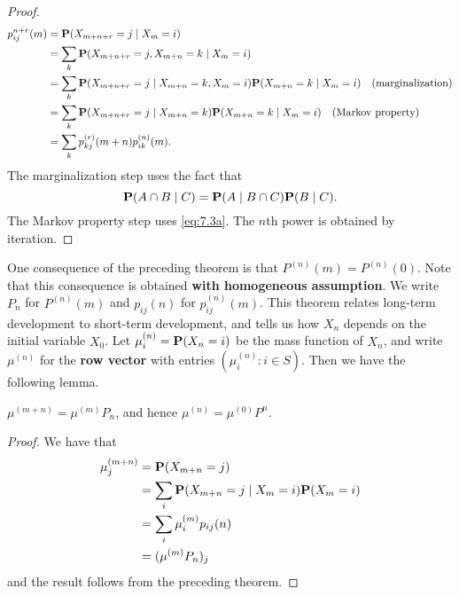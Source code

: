 \begin{proof}
    \begin{equation*}
        \begin{split}
            p_{ij}^{n+r}(m) &= \mathbf{P}(X_{m+n+r} = j \;\vert\; X_m = i) \\ 
            &= \sum_{k} \mathbf{P}(X_{m+n+r} = j, X_{m+n} = k \;\vert\; X_m = i) \\
            &= \sum_{k} \mathbf{P}(X_{m+n+r} = j \;\vert\; X_{m+n} = k, X_m = i) \mathbf{P}(X_{m+n} = k \;\vert\; X_m = i) \quad \text{(marginalization)} \\
            &= \sum_{k} \mathbf{P}(X_{m+n+r} = j \;\vert\; X_{m+n} = k) \mathbf{P}(X_{m+n} = k \;\vert\; X_m = i) \quad \text{(Markov property)} \\
            &= \sum_{k} p_{kj}^{(r)}(m+n) p_{ik}^{(n)}(m) . 
        \end{split}
    \end{equation*}
    The marginalization step uses the fact that 
    \begin{equation*}
        \mathbf{P}(A \cap B \;\vert\; C) = \mathbf{P}(A \;\vert\; B \cap C) \mathbf{P}(B \;\vert\; C).
    \end{equation*}
    The Markov property step uses \eqref{eq:7.3a}. The $n$th power is obtained by iteration.
\end{proof}

One consequence of the preceding theorem is that $P^{(n)}(m) = P^{(n)}(0)$. Note that this consequence is obtained \textbf{with homogeneous assumption}. We write $P_n$ for $P^{(n)}(m)$ and $p_{ij}(n)$ for $p_{ij}^{(n)}(m)$. This theorem relates long-term development to short-term development, and tells us how $X_n$ depends on the initial variable $X_0$. Let $\mu_i^{(n)} = \mathbf{P}(X_n = i)$ be the mass function of $X_n$, and write $\mu^{(n)}$ for the \textbf{row vector} with entries $(\mu_i^{(n)} : i \in S)$. Then we have the following lemma.

\begin{lemma}
$\mu^{(m+n)} = \mu^{(m)}P_n$, and hence $\mu^{(n)} = \mu^{(0)}P^n$.
\end{lemma}

\begin{proof}
    We have that
    \begin{equation*}
        \begin{split}
            \mu_j^{(m+n)} &= \mathbf{P}(X_{m+n} = j) \\
            &= \sum_{i} \mathbf{P}(X_{m+n} = j \;\vert\; X_m = i) \mathbf{P}(X_m = i) \\
            &= \sum_{i} \mu_i^{(m)} p_{ij}(n) \\
            &= (\mu^{(m)} P_n)_j
        \end{split}
    \end{equation*}
    and the result follows from the preceding theorem.
\end{proof}


